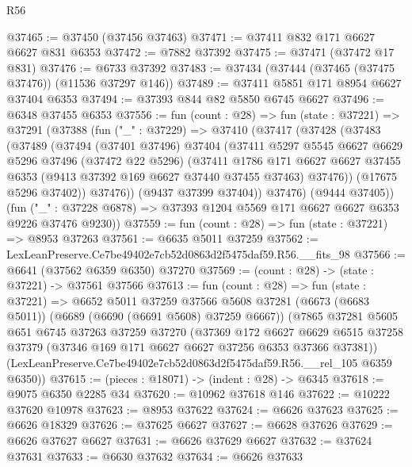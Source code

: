 \begin{lexlean}{R56}
\begin{coremodule}
@37465 := @37450 (@37456 @37463)
@37471 := @37411 @832 @171 @6627 @6627 @831 @6353
@37472 := @7882 @37392
@37475 := @37471 (@37472 @17 @831)
@37476 := @6733 @37392
@37483 := @37434 (@37444 (@37465 (@37475 @37476)) (@11536 @37297 @146))
@37489 := @37411 @5851 @171 @8954 @6627 @37404 @6353
@37494 := @37393 @844 @82 @5850 @6745 @6627
@37496 := @6348 @37455 @6353
@37556 := fun (count : @28) =>
  fun (state : @37221) =>
  @37291
    (@37388
      (fun ("_" : @37229) =>
      @37410
        (@37417
          (@37428
            (@37483
              (@37489
                (@37494
                  (@37401 @37496)
                  @37404
                  (@37411
                    @5297
                    @5545
                    @6627
                    @6629
                    @5296
                    @37496
                    (@37472 @22 @5296)
                    (@37411
                      @1786
                      @171
                      @6627
                      @6627
                      @37455
                      @6353
                      (@9413 @37392 @169 @6627 @37440 @37455 @37463)
                      @37476))
                  (@17675 @5296 @37402))
                @37476))
            (@9437 @37399 @37404))
          @37476)
        (@9444 @37405))
      (fun ("_" : @37228 @6878) => @37393 @1204 @5569 @171 @6627 @6627 @6353 @9226 @37476 @9230))
@37559 := fun (count : @28) => fun (state : @37221) => @8953 @37263
@37561 := @6635 @5011 @37259
@37562 := LexLeanPreserve.Ce7be49402e7cb52d0863d2f5475daf59.R56.__fits_98
@37566 := @6641 (@37562 @6359 @6350) @37270
@37569 := (count : @28) -> (state : @37221) -> @37561 @37566
@37613 := fun (count : @28) =>
  fun (state : @37221) =>
  @6652
    @5011
    @37259
    @37566
    @5608
    @37281
    (@6673 (@6683 @5011))
    (@6689 (@6690 (@6691 @5608) @37259 @6667))
    (@7865
      @37281
      @5605
      @651
      @6745
      @37263
      @37259
      @37270
      (@37369
        @172
        @6627
        @6629
        @6515
        @37258
        @37379
        (@37346 @169 @171 @6627 @6627 @37256 @6353 @37366 @37381))
      (LexLeanPreserve.Ce7be49402e7cb52d0863d2f5475daf59.R56.__rel_105 @6359 @6350))
@37615 := (pieces : @18071) -> (indent : @28) -> @6345
@37618 := @9075 @6350 @2285 @34
@37620 := @10962 @37618 @146
@37622 := @10222 @37620 @10978
@37623 := @8953 @37622
@37624 := @6626 @37623
@37625 := @6626 @18329
@37626 := @37625 @6627
@37627 := @6628 @37626
@37629 := @6626 @37627 @6627
@37631 := @6626 @37629 @6627
@37632 := @37624 @37631
@37633 := @6630 @37632
@37634 := @6626 @37633

\end{coremodule}
\end{lexlean}
